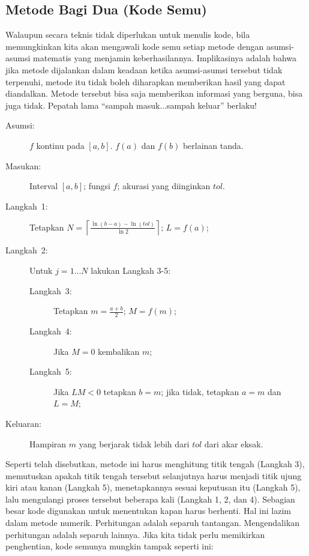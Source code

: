 \subsection{Metode Bagi Dua (Kode Semu)}

Walaupun secara teknis tidak diperlukan untuk menulis kode, bila memungkinkan
kita akan mengawali kode semu setiap metode dengan asumsi-asumsi matematis
yang menjamin keberhasilannya. Implikasinya adalah bahwa jika metode
dijalankan dalam keadaan ketika asumsi-asumsi tersebut tidak terpenuhi,
metode itu tidak boleh diharapkan memberikan hasil yang dapat diandalkan.
Metode tersebut bisa saja memberikan informasi yang berguna, bisa
juga tidak. Pepatah lama ``sampah masuk...sampah keluar'' berlaku!

\begin{pseudocode} 
\begin{description}
\item [{Asumsi:}] $f$ kontinu pada $[a,b]$. $f(a)$ dan $f(b)$ berlainan
tanda.
\item [{Masukan:}] Interval $[a,b]$; fungsi $f$; akurasi yang diinginkan
$tol$.
\item [{Langkah~1:}] Tetapkan $N=\left\lceil \frac{\ln(b-a)-\ln(tol)}{\ln2}\right\rceil $;
$L=f(a)$;
\item [{Langkah~2:}] Untuk $j=1\ldots N$ lakukan Langkah 3-5:

\begin{description}
\item [{Langkah~3:}] Tetapkan $m=\frac{a+b}{2}$; $M=f(m)$;
\item [{Langkah~4:}] Jika $M=0$ kembalikan $m$;
\item [{Langkah~5:}] Jika $LM<0$ tetapkan $b=m$; jika tidak, tetapkan
$a=m$ dan $L=M$;
\end{description}
\item [{Keluaran:}] Hampiran $m$ yang berjarak tidak lebih dari $tol$
dari akar eksak.
\end{description}
\end{pseudocode}  

Seperti telah disebutkan, metode ini harus menghitung titik tengah
(Langkah 3), memutuskan apakah titik tengah tersebut selanjutnya harus
menjadi titik ujung kiri atau kanan (Langkah 5), menetapkannya sesuai
keputusan itu (Langkah 5), lalu mengulangi proses tersebut beberapa
kali (Langkah 1, 2, dan 4). Sebagian besar kode digunakan untuk menentukan
kapan harus berhenti. Hal ini lazim dalam metode numerik. Perhitungan
adalah separuh tantangan. Mengendalikan perhitungan adalah separuh
lainnya. Jika kita tidak perlu memikirkan penghentian, kode semunya
mungkin tampak seperti ini: 

